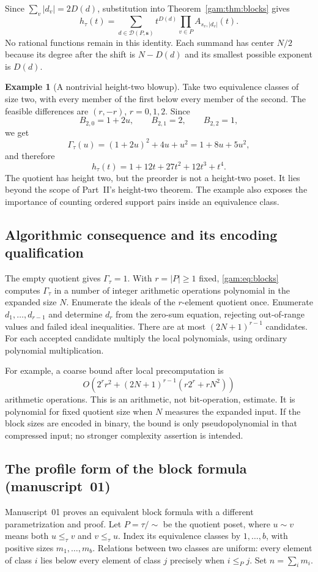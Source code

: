 \documentclass[11pt]{article}
\numberwithin{equation}{section}
\theoremstyle{definition}
\newtheorem{example}[theorem]{Example}%
\begin{document}
Since $\sum_v|d_v|=2D(d)$, substitution into
Theorem~\ref{gam:thm:blocks} gives
\begin{equation}
 h_\tau(t)=\sum_{d\in\mathcal D(P,\mathbf s)}
                    t^{D(d)}\prod_{v\in P}A_{s_v,|d_v|}(t).
 \label{gam:eq:blockh}
\end{equation}
No rational functions remain in this identity. Each summand has center
$N/2$ because its degree after the shift is $N-D(d)$ and its smallest
possible exponent is $D(d)$.

\begin{example}[A nontrivial height-two blowup]\label{gam:ex:twoblocks}
Take two equivalence classes of size two, with every member of the first
below every member of the second. The feasible differences are $(r,-r)$,
$r=0,1,2$. Since
\[
 B_{2,0}=1+2u,\qquad B_{2,1}=2,\qquad B_{2,2}=1,
\]
we get
\[
 \Gamma_\tau(u)=(1+2u)^2+4u+u^2=1+8u+5u^2,
\]
and therefore
\[
 h_\tau(t)=1+12t+27t^2+12t^3+t^4.
\]
The quotient has height two, but the preorder is not a height-two poset.
It lies beyond the scope of Part~II's height-two theorem.
The example also exposes the importance of counting ordered support pairs
inside an equivalence class.
\end{example}

\subsection{Algorithmic consequence and its encoding qualification}
The empty quotient gives $\Gamma_\tau=1$. With $r=|P|\ge1$ fixed,
\eqref{gam:eq:blocks} computes $\Gamma_\tau$ in a number of integer
arithmetic operations polynomial in the expanded size $N$. Enumerate the
ideals of the $r$-element quotient once. Enumerate $d_1,\ldots,d_{r-1}$ and
determine $d_r$ from the zero-sum equation, rejecting out-of-range values and
failed ideal inequalities. There are at most $(2N+1)^{r-1}$ candidates. For
each accepted candidate multiply the local polynomials, using ordinary
polynomial multiplication.

For example, a coarse bound after local precomputation is
\[
 O\!\left(2^r r^2+(2N+1)^{r-1}(r2^r+rN^2)\right)
\]
arithmetic operations. This is an arithmetic, not bit-operation, estimate.
It is polynomial for fixed quotient size when $N$ measures the expanded
input. If the block sizes are encoded in binary, the bound is only
pseudopolynomial in that compressed input; no stronger complexity assertion
is intended.

\subsection{The profile form of the block formula (manuscript~01)}
\label{gam:gv:sec:blocks}
Manuscript~01 proves an equivalent block formula with a different
parametrization and proof. Let $P=\tau/{\sim}$ be the quotient poset, where
$u\sim v$ means both $u\le_\tau v$ and $v\le_\tau u$. Index its equivalence
classes by $1,\ldots,b$, with positive sizes $m_1,\ldots,m_b$. Relations
between two classes are uniform: every element of class $i$ lies below every
element of class $j$ precisely when $i\le_P j$. Set $n=\sum_i m_i$.
\end{document}
